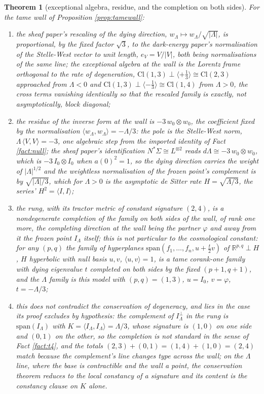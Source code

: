 \documentclass[11pt]{article}
\newtheorem{theorem}{Theorem}[section]
\theoremstyle{definition}
\newcommand{\Cl}{\mathrm{Cl}}
\newcommand{\R}{\mathbb{R}}
\newcommand{\ip}[2]{\langle #1, #2\rangle}
\begin{document}
\begin{theorem}[exceptional algebra, residue, and the completion on both sides]\label{thm:lambdawall}
For the tame wall of Proposition \ref{prop:tamewall}:
\begin{enumerate}
\item[(i)] the sheaf paper's rescaling of the dying direction, $w_{\Lambda} \mapsto w_{\Lambda}/\sqrt{|\Lambda|}$, is proportional, by the fixed factor $\sqrt 3$, to the dark-energy paper's normalisation of the Stelle-West vector to unit length, $e_{V} = V/|V|$, both being normalisations of the same line; the exceptional algebra at the wall is the Lorentz frame orthogonal to the rate of degeneration, $\Cl(1,3) \perp \langle +\tfrac13\rangle \cong \Cl(2,3)$ approached from $\Lambda < 0$ and $\Cl(1,3) \perp \langle -\tfrac13\rangle \cong \Cl(1,4)$ from $\Lambda > 0$, the cross terms vanishing identically so that the rescaled family is exactly, not asymptotically, block diagonal;
\item[(ii)] the residue of the inverse form at the wall is $-3\,w_{0} \otimes w_{0}$, the coefficient fixed by the normalisation $\ip{w_{\Lambda}}{w_{\Lambda}} = -\Lambda/3$: the pole is the Stelle-West norm, $\Lambda\,\ip{V}{V} = -3$, one algebraic step from the imported identity of Fact \ref{fact:null}; the sheaf paper's identification $N^{*}\Sigma \cong L^{\otimes 2}$ reads $d\Lambda \cong -3\, w_{0} \otimes w_{0}$, which is $-3\,I_{0} \otimes I_{0}$ when $a(0)^{2} = 1$, so the dying direction carries the weight of $|\Lambda|^{1/2}$ and the weightless normalisation of the frozen point's complement is by $\sqrt{|\Lambda|/3}$, which for $\Lambda > 0$ is the asymptotic de Sitter rate $H = \sqrt{\Lambda/3}$, the series' $H^{2} = \ip{I}{I}$;
\item[(iii)] the rung, with its tractor metric of constant signature $(2,4)$, is a nondegenerate completion of the family on both sides of the wall, of rank one more, the completing direction at the wall being the partner $\varphi$ and away from it the frozen point $I_{\Lambda}$ itself; this is not particular to the cosmological constant: for any $(p,q)$ the family of hyperplanes $\mathrm{span}(f_{1}, \ldots, f_{n}, u + \tfrac{t}{2}v)$ of $\R^{p,q} \perp H$, $H$ hyperbolic with null basis $u, v$, $\ip{u}{v} = 1$, is a tame corank-one family with dying eigenvalue $t$ completed on both sides by the fixed $(p+1,q+1)$, and the $\Lambda$ family is this model with $(p,q) = (1,3)$, $u = I_{0}$, $v = \varphi$, $t = -\Lambda/3$;
\item[(iv)] this does not contradict the conservation of degeneracy, and lies in the case its proof excludes by hypothesis: the complement of $I_{\Lambda}^{\perp}$ in the rung is $\mathrm{span}(I_{\Lambda})$ with $K = \ip{I_{\Lambda}}{I_{\Lambda}} = \Lambda/3$, whose signature is $(1,0)$ on one side and $(0,1)$ on the other, so the completion is not standard in the sense of Fact \ref{fact:t4}, and the totals $(2,3) + (0,1) = (1,4) + (1,0) = (2,4)$ match because the complement's line changes type across the wall; on the $\Lambda$ line, where the base is contractible and the wall a point, the conservation theorem reduces to the local constancy of a signature and its content is the constancy clause on $K$ alone.

\end{enumerate}
\end{theorem}
\end{document}

